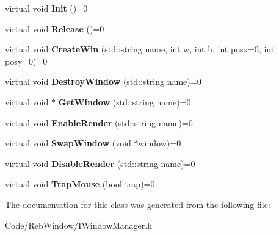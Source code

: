 \begin{DoxyCompactItemize}
\item 
virtual void {\bfseries Init} ()=0\hypertarget{class_i_window_manager_a43e41076eb824b0e52dde29a28db9df8}{}\label{class_i_window_manager_a43e41076eb824b0e52dde29a28db9df8}

\item 
virtual void {\bfseries Release} ()=0\hypertarget{class_i_window_manager_afa49e2a263b7690f2b0745c0534198c8}{}\label{class_i_window_manager_afa49e2a263b7690f2b0745c0534198c8}

\item 
virtual void {\bfseries Create\+Win} (std\+::string name, int w, int h, int posx=0, int posy=0)=0\hypertarget{class_i_window_manager_a721402c56e32650d79fc85982708c991}{}\label{class_i_window_manager_a721402c56e32650d79fc85982708c991}

\item 
virtual void {\bfseries Destroy\+Window} (std\+::string name)=0\hypertarget{class_i_window_manager_aced5a16a6f3f645cbfa3421b20f2bcdb}{}\label{class_i_window_manager_aced5a16a6f3f645cbfa3421b20f2bcdb}

\item 
virtual void $\ast$ {\bfseries Get\+Window} (std\+::string name)=0\hypertarget{class_i_window_manager_a3197d118b10af0d714881c81658ac6da}{}\label{class_i_window_manager_a3197d118b10af0d714881c81658ac6da}

\item 
virtual void {\bfseries Enable\+Render} (std\+::string name)=0\hypertarget{class_i_window_manager_a53ce6ab8759917bba298f8b5146724d0}{}\label{class_i_window_manager_a53ce6ab8759917bba298f8b5146724d0}

\item 
virtual void {\bfseries Swap\+Window} (void $\ast$window)=0\hypertarget{class_i_window_manager_a81d1183a1050b52e9a11fc77b9b297b7}{}\label{class_i_window_manager_a81d1183a1050b52e9a11fc77b9b297b7}

\item 
virtual void {\bfseries Disable\+Render} (std\+::string name)=0\hypertarget{class_i_window_manager_ae639c7c7a6de9a41c2179e61abbf1408}{}\label{class_i_window_manager_ae639c7c7a6de9a41c2179e61abbf1408}

\item 
virtual void {\bfseries Trap\+Mouse} (bool trap)=0\hypertarget{class_i_window_manager_aef2c326099c719fa84afa20c87b156d2}{}\label{class_i_window_manager_aef2c326099c719fa84afa20c87b156d2}

\end{DoxyCompactItemize}


The documentation for this class was generated from the following file\+:\begin{DoxyCompactItemize}
\item 
Code/\+Reb\+Window/I\+Window\+Manager.\+h\end{DoxyCompactItemize}
